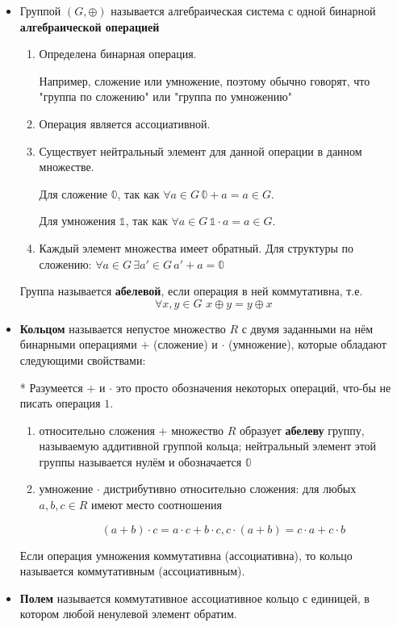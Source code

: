 \begin{itemize}
	\item Группой $(G, \oplus)$ называется алгебраическая система с одной бинарной 
	{\bf алгебраической операцией}
	 
	\begin{enumerate}
		\item Определена бинарная операция. 
		
		Например, сложение или умножение, поэтому обычно говорят, что "группа по сложению" или "группа по умножению"
		
		\item Операция является ассоциативной.
		
		\item Существует нейтральный элемент для данной операции в данном множестве.
		
		Для сложение $\mathbb{0}$, так как $\forall a \in G \, \mathbb{0} + a = a \in G$.
		
		Для умножения $\mathbb{1}$, так как $\forall a \in G \, \mathbb{1} \cdot a = a \in G$.
		
		\item Каждый элемент множества имеет обратный. Для структуры по сложению: $\forall a \in G \, \exists a' \in G \, a' + a = \mathbb{0}$
	
	\end{enumerate}
	
	Группа называется {\bf абелевой}, если операция в ней коммутативна, т.е. $$\forall x, y \in G \, \, x \oplus y = y \oplus x$$

	\item {\bf Кольцом} называется непустое множество $R$ с двумя заданными на нём бинарными операциями $+$ (сложение) и $\cdot$ (умножение), которые обладают следующими свойствами:
	
	* Разумеется $+$ и $\cdot$ это просто обозначения некоторых операций, что-бы не писать операция $1$.
		
	\begin{enumerate}
		
		\item  относительно сложения $+$ множество $R$ образует {\bf абелеву} группу, называемую аддитивной группой кольца; нейтральный элемент этой группы называется нулём и обозначается $\mathbb{0}$
		
		\item умножение $\cdot$ дистрибутивно относительно сложения: для любых $a, b, c \in R$ имеют место соотношения
		
		$$(a + b) \cdot c = a \cdot c + b \cdot c, c \cdot (a + b) = c \cdot a + c \cdot b$$
		
	\end{enumerate}
	
	Если операция умножения коммутативна (ассоциативна), то кольцо называется коммутативным (ассоциативным).
	
	\item {\bf Полем} называется коммутативное ассоциативное кольцо с единицей, в котором любой ненулевой элемент обратим.
	
\end{itemize}

